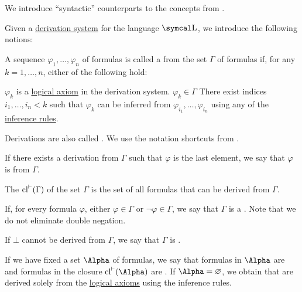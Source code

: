 \begin{definition}\label{def:first_order_proofs}
  We introduce \enquote{syntactic} counterparts to the concepts from .

  Given a \hyperref[def:first_order_derivation_system]{derivation system} for the language \( \CL \), we introduce the following notions:
  \begin{DefEnum}
    A sequence \( \varphi_1, \ldots, \varphi_n \) of formulas is called a  from the set \( \Gamma \) of formulas if, for any \( k = 1, \ldots, n \), either of the following hold:
    \begin{DefEnum}
       \( \varphi_k \) is a \hyperref[def:first_order_derivation_system/axioms]{logical axiom} in the derivation system.
       \( \varphi_k \in \Gamma \)
       There exist indices \( i_1, \ldots, i_n < k \) such that \( \varphi_k \) can be inferred from \( \varphi_{i_1}, \ldots, \varphi_{i_n} \) using any of the \hyperref[def:first_order_derivation_system/rules]{inference rules}.
    \end{DefEnum}

    Derivations are also called . We use the notation shortcuts from .

     If there exists a derivation from \( \Gamma \) such that \( \varphi \) is the last element, we say that \( \varphi \) is  from \( \Gamma \).

     The  \( \operatorname{cl}^{\vdash}(\Gamma) \) of the set \( \Gamma \) is the set of all formulas that can be derived from \( \Gamma \).

    If, for every formula \( \varphi \), either \( \varphi \in \Gamma \) or \( \neg \varphi \in \Gamma \), we say that \( \Gamma \) is a . Note that we do not eliminate double negation.

    If \( \bot \) cannot be derived from \( \Gamma \), we say that \( \Gamma \) is .

     If we have fixed a set \( \Alpha \) of formulas, we say that formulas in \( \Alpha \) are  and formulas in the closure \( \Cl^{\vdash}(\Alpha) \) are . If \( \Alpha = \varnothing \), we obtain  that are derived solely from the \hyperref[def:first_order_derivation_system/axioms]{logical axioms} using the inference rules.
  \end{DefEnum}
\end{definition}

